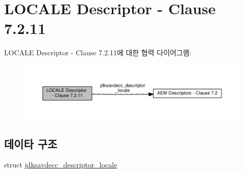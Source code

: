 \hypertarget{group__descriptor__locale}{}\section{L\+O\+C\+A\+LE Descriptor -\/ Clause 7.2.11}
\label{group__descriptor__locale}
L\+O\+C\+A\+LE Descriptor -\/ Clause 7.2.11에 대한 협력 다이어그램\+:
\nopagebreak
\begin{figure}[H]
\begin{center}
\leavevmode
\includegraphics[width=350pt]{group__descriptor__locale}
\end{center}
\end{figure}
\subsection*{데이타 구조}
\begin{DoxyCompactItemize}
\item 
struct \hyperlink{structjdksavdecc__descriptor__locale}{jdksavdecc\+\_\+descriptor\+\_\+locale}
\end{DoxyCompactItemize}
